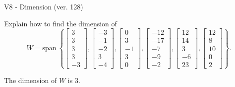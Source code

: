 \begin{exercise}
  \begin{exerciseTitle}V8 - Dimension (ver. 128)\end{exerciseTitle}
  \begin{exerciseStatement}
    Explain how to find the dimension of 
\[W=\mathrm{span}\ \left\{\left[\begin{array}{r}
3 \\
3 \\
3 \\
3 \\
-3
\end{array}\right] , \left[\begin{array}{r}
-3 \\
-1 \\
-2 \\
3 \\
-4
\end{array}\right] , \left[\begin{array}{r}
0 \\
3 \\
-1 \\
3 \\
0
\end{array}\right] , \left[\begin{array}{r}
-12 \\
-17 \\
-7 \\
-9 \\
-2
\end{array}\right] , \left[\begin{array}{r}
12 \\
14 \\
3 \\
-6 \\
23
\end{array}\right] , \left[\begin{array}{r}
12 \\
8 \\
10 \\
0 \\
2
\end{array}\right]\right\}.\]



  \end{exerciseStatement}
  \begin{exerciseAnswer}
   The dimension of \(W\) is  \(3\).
  


  \end{exerciseAnswer}
\end{exercise}